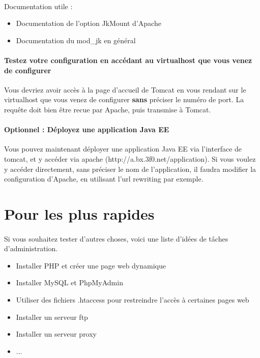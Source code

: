 \documentclass[12pt,a4paper]{article}
\begin{document}
\paragraph{}
Documentation utile : 
\begin{itemize}
\item Documentation de l'option JkMount d'Apache
\item Documentation du mod\_jk en général
\end{itemize}

\paragraph{Testez votre configuration en accédant au virtualhost que vous venez de configurer\\}
Vous devriez avoir accès à la page d'accueil de Tomcat en vous rendant sur le virtualhost que vous venez de configurer \textbf{sans} préciser le numéro de port. La requête doit bien être recue par Apache, puis transmise à Tomcat.

\paragraph{Optionnel : Déployez une application Java EE\\}
Vous pouvez maintenant déployer une application Java EE via l'interface de tomcat, et y accéder via apache (http://a.bx.3f0.net/application). Si vous voulez y accéder directement, sans préciser le nom de l'application, il faudra modifier la configuration d'Apache, en utilisant l'url rewriting par exemple.

\section{Pour les plus rapides}

\paragraph{}
Si vous souhaitez tester d'autres choses, voici une liste d'idées de tâches d'administration.
\begin{itemize}
\item Installer PHP et créer une page web dynamique
\item Installer MySQL et PhpMyAdmin
\item Utiliser des fichiers .htaccess pour restreindre l'accès à certaines pages web
\item Installer un serveur ftp
\item Installer un serveur proxy
\item ...
\end{itemize}
\end{document}
